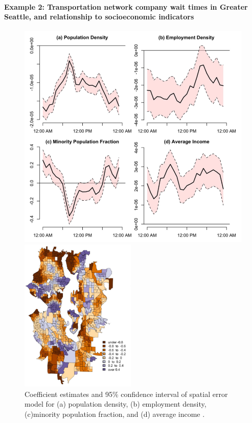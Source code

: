 \documentclass[11pt]{article}
\begin{document}
\paragraph{Example 2: Transportation network company wait times in Greater Seattle, and relationship to socioeconomic indicators}
\begin{figure}[!tbp]
  \centering
  \begin{minipage}[b]{0.45\textwidth}
    \includegraphics[width=\textwidth]{hughes1.png}
    \caption{Coefficient estimates and 95\% confidence interval of spatial error model for (a) population density, (b) employment density, (c)minority population fraction, and (d) average income \cite{hughes2016transportation}.}
    \label{fig:hughes1}
  \end{minipage}
  \hfill
  \begin{minipage}[b]{0.45\textwidth}
    \centering
    \includegraphics[height=2.9in]{hughes2.png}

\end{minipage}
\end{figure}
\end{document}
